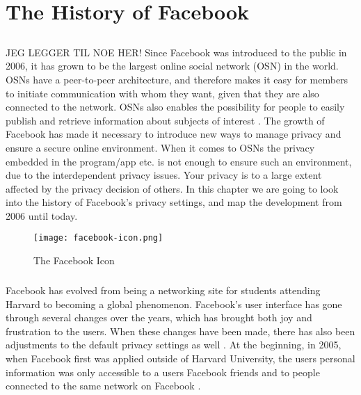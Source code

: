\chapter{The History of Facebook}
\label{chp:facebookhistory} 

\section{}\label{sec:first_section}
\paragraph{}
JEG LEGGER TIL NOE HER!
Since Facebook was introduced to the public in 2006, it has grown to be the largest online social network (OSN) in the world. OSNs have a peer-to-peer architecture, and therefore makes it easy for members to initiate communication with whom they want, given that they are also connected to the network. OSNs also enables the possibility for people to easily publish and retrieve information about subjects of interest \cite{DPBook}. The growth of Facebook has made it necessary to introduce new ways to manage privacy and ensure a secure online environment. When it comes to OSNs the privacy embedded in the program/app etc. is not enough to ensure such an environment, due to the interdependent privacy issues. Your privacy is to a large extent affected by the privacy decision of others. In this chapter we are going to look into the history of Facebook’s privacy settings, and map the development from 2006 until today. 

\begin{figure}[h!]
\centering
\texttt{[image: facebook-icon.png]}
\caption{The Facebook Icon}
\end{figure}

\paragraph{}
Facebook has evolved from being a networking site for students attending Harvard to becoming a global phenomenon. Facebook's user interface has gone through several changes over the years, which has brought both joy and frustration to the users. When these changes have been made, there has also been adjustments to the default privacy settings as well \cite{EvoPriv2}. At the beginning, in 2005, when Facebook first was applied outside of Harvard University, the users personal information was only accessible to a users Facebook friends and to people connected to the same network on Facebook \cite{EvoPriv}. 


